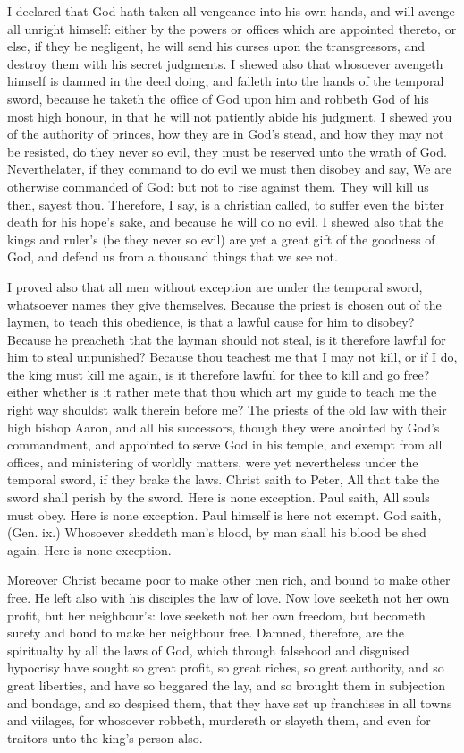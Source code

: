 I declared that God hath taken all vengeance into his 
own hands, and will avenge all unright himself: either by 
the powers or offices which are appointed thereto, or else, 
if they be negligent, he will send his curses upon the 
transgressors, and destroy them with his secret judgments. 
I shewed also that whosoever avengeth himself is damned 
in the deed doing, and falleth into the hands of the temporal
sword, because he taketh the office of God upon him 
and robbeth God of his most high honour, in that he will 
not patiently abide his judgment. I shewed you of the 
authority of princes, how they are in God's stead, and how 
they may not be resisted, do they never so evil, they must 
be reserved unto the wrath of God. Neverthelater, if 
they command to do evil we must then disobey and say, 
We are otherwise commanded of God: but not to rise 
against them. They will kill us then, sayest thou. Therefore,
I say, is a christian called, to suffer even the bitter 
death for his hope's sake, and because he will do no evil. 
I shewed also that the kings and ruler's (be they never so 
evil) are yet a great gift of the goodness of God, and defend
us from a thousand things that we see not. 

I proved also that all men without exception are under 
the temporal sword, whatsoever names they give themselves. 
Because the priest is chosen out of the laymen, to teach 
this obedience, is that a lawful cause for him to disobey? 
Because he preacheth that the layman should not steal, is 
it therefore lawful for him to steal unpunished? Because 
thou teachest me that I may not kill, or if I do, the king 
must kill me again, is it therefore lawful for thee to kill 
and go free? either whether is it rather mete that thou 
which art my guide to teach me the right way shouldst 
walk therein before me? The priests of the old law with 
their high bishop Aaron, and all his successors, though 
they were anointed by God's commandment, and appointed 
to serve God in his temple, and exempt from all offices, 
and ministering of worldly matters, were yet nevertheless 
under the temporal sword, if they brake the laws. Christ 
saith to Peter, All that take the sword shall perish by the 
sword. Here is none exception. Paul saith, All souls 
must obey. Here is none exception. Paul himself is 
here not exempt. God saith, (Gen. ix.) Whosoever 
sheddeth man's blood, by man shall his blood be shed 
again. Here is none exception. 

Moreover Christ became poor to make other men rich, 
and bound to make other free. He left also with his 
disciples the law of love. Now love seeketh not her own 
profit, but her neighbour's: love seeketh not her own 
freedom, but becometh surety and bond to make her 
neighbour free. Damned, therefore, are the spiritualty 
by all the laws of God, which through falsehood and disguised
hypocrisy have sought so great profit, so great 
riches, so great authority, and so great liberties, and have 
so beggared the lay, and so brought them in subjection 
and bondage, and so despised them, that they have set up 
franchises in all towns and viilages, for whosoever robbeth, 
murdereth or slayeth them, and even for traitors unto the 
king's person also. 

